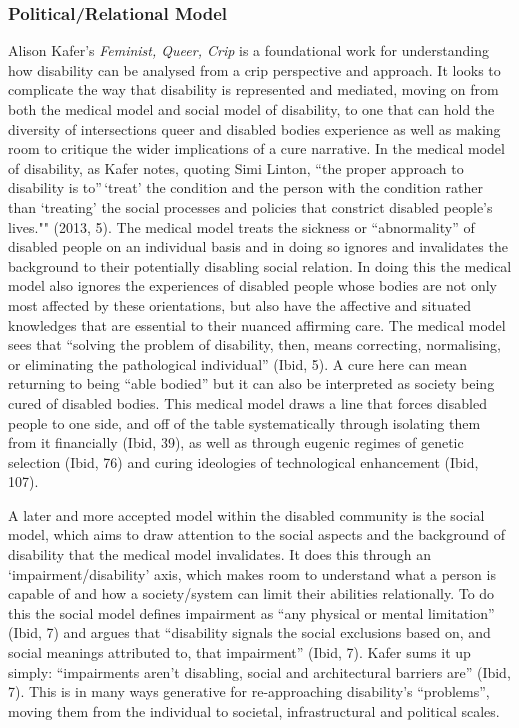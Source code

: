 \hypertarget{politicalrelational-model}{%
\subsubsection[Political/Relational
Model]{\texorpdfstring{\protect\hypertarget{anchor}{}{}Political/Relational
Model}{Political/Relational Model}}\label{politicalrelational-model}}

Alison Kafer's \emph{Feminist, Queer, Crip} is a foundational work for
understanding how disability can be analysed from a crip perspective and
approach. It looks to complicate the way that disability is represented
and mediated, moving on from both the medical model and social model of
disability, to one that can hold the diversity of intersections queer
and disabled bodies experience as well as making room to critique the
wider implications of a cure narrative. In the medical model of
disability, as Kafer notes, quoting Simi Linton, ``the proper approach
to disability is to''\,`treat' the condition and the person with the
condition rather than `treating' the social processes and policies that
constrict disabled people's lives."" (2013, 5). The medical model treats
the sickness or ``abnormality'' of disabled people on an individual
basis and in doing so ignores and invalidates the background to their
potentially disabling social relation. In doing this the medical model
also ignores the experiences of disabled people whose bodies are not
only most affected by these orientations, but also have the affective
and situated knowledges that are essential to their nuanced affirming
care. The medical model sees that ``solving the problem of disability,
then, means correcting, normalising, or eliminating the pathological
individual'' (Ibid, 5). A cure here can mean returning to being ``able
bodied'' but it can also be interpreted as society being cured of
disabled bodies. This medical model draws a line that forces disabled
people to one side, and off of the table systematically through
isolating them from it financially (Ibid, 39), as well as through
eugenic regimes of genetic selection (Ibid, 76) and curing ideologies of
technological enhancement (Ibid, 107).

A later and more accepted model within the disabled community is the
social model, which aims to draw attention to the social aspects and the
background of disability that the medical model invalidates. It does
this through an `impairment/disability' axis, which makes room to
understand what a person is capable of and how a society/system can
limit their abilities relationally. To do this the social model defines
impairment as ``any physical or mental limitation'' (Ibid, 7) and argues
that ``disability signals the social exclusions based on, and social
meanings attributed to, that impairment'' (Ibid, 7). Kafer sums it up
simply: ``impairments aren't disabling, social and architectural
barriers are'' (Ibid, 7). This is in many ways generative for
re-approaching disability's ``problems'', moving them from the
individual to societal, infrastructural and political scales.

